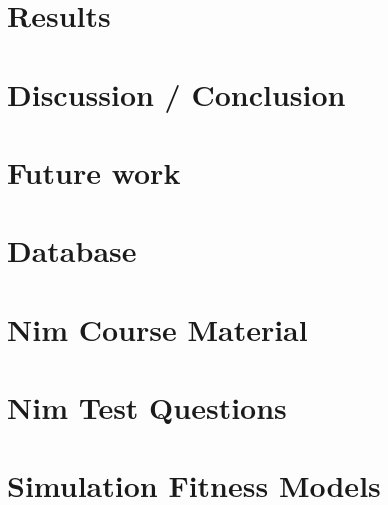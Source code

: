\documentclass{memoir}
\begin{document}
\chapter{Results}
\label{ch:results}

\chapter{Discussion / Conclusion}
\label{ch:discussion_conclusion}

\chapter{Future work}
\label{ch:future_work}






\appendix
\chapter{Database}
\label{ax_database}

\chapter{Nim Course Material}
\label{ax_resources}

\chapter{Nim Test Questions}
\label{ax_questions}

\chapter{Simulation Fitness Models}
\label{ax_simulation_fitness_models}

\end{document}

